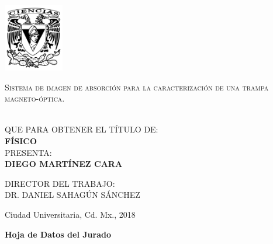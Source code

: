 \documentclass[12pt,twoside]{article}
\begin{document}
\begin{minipage}[c][0.8\textheight][t]{0.2\textwidth}
\begin{center}
\vspace{0.1cm}
\hskip2pt
\vrule width2.5pt height15cm
        \hskip1mm
        \vrule width1pt height15cm \\
        \includegraphics[height=3cm]{LogoCiencias.png}
        \end{center}
\end{minipage}
\begin{minipage}[c][0.6\textheight][t]{0.85\textwidth}
  \begin{center}
    {\Large \scshape {Sistema de imagen de absorción para la caracterización de una trampa magneto-óptica.}}

    \vspace{2cm}


      \\[8pt] \vspace{2cm}
    QUE PARA OBTENER EL T\'ITULO DE:\\[5pt]
    {\large \textbf{{FÍSICO}}}\\[40pt]            
    PRESENTA:\\[5pt]
    \textbf{{DIEGO MARTÍNEZ CARA}}

    \vspace{1cm}

    {\small DIRECTOR DEL TRABAJO:\\ {DR. DANIEL SAHAGÚN SÁNCHEZ}}

    \vspace{0.5cm}

    {Ciudad Universitaria, Cd. Mx.,}{ }{2018}
  \end{center}
\end{minipage}

\clearpage
\begin{center}
\Large \textbf{Hoja de Datos del Jurado}
\end{center}
\small
\end{document}
